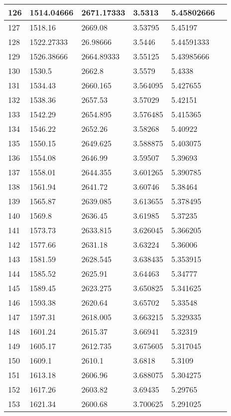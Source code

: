 \documentclass[twocolumn]{article}
\begin{document}
\begin{tabular}{l|l|l|l|l|l}
126	&	1514.04666	&	2671.17333	&	3.5313	&	5.45802666 \\ \hline
127	&	1518.16	&	2669.08	&	3.53795	&	5.45197 \\ \hline
128	&	1522.27333	&	26.98666	&	3.5446	&	5.44591333 \\ \hline
129	&	1526.38666	&	2664.89333	&	3.55125	&	5.43985666 \\ \hline
130	&	1530.5	&	2662.8	&	3.5579	&	5.4338 \\ \hline
131	&	1534.43	&	2660.165	&	3.564095	&	5.427655 \\ \hline
132	&	1538.36	&	2657.53	&	3.57029	&	5.42151 \\ \hline
133	&	1542.29	&	2654.895	&	3.576485	&	5.415365 \\ \hline
134	&	1546.22	&	2652.26	&	3.58268	&	5.40922 \\ \hline
135	&	1550.15	&	2649.625	&	3.588875	&	5.403075 \\ \hline
136	&	1554.08	&	2646.99	&	3.59507	&	5.39693 \\ \hline
137	&	1558.01	&	2644.355	&	3.601265	&	5.390785 \\ \hline
138	&	1561.94	&	2641.72	&	3.60746	&	5.38464 \\ \hline
139	&	1565.87	&	2639.085	&	3.613655	&	5.378495 \\ \hline
140	&	1569.8	&	2636.45	&	3.61985	&	5.37235 \\ \hline
141	&	1573.73	&	2633.815	&	3.626045	&	5.366205 \\ \hline
142	&	1577.66	&	2631.18	&	3.63224	&	5.36006 \\ \hline
143	&	1581.59	&	2628.545	&	3.638435	&	5.353915 \\ \hline
144	&	1585.52	&	2625.91	&	3.64463	&	5.34777 \\ \hline
145	&	1589.45	&	2623.275	&	3.650825	&	5.341625 \\ \hline
146	&	1593.38	&	2620.64	&	3.65702	&	5.33548 \\ \hline
147	&	1597.31	&	2618.005	&	3.663215	&	5.329335 \\ \hline
148	&	1601.24	&	2615.37	&	3.66941	&	5.32319 \\ \hline
149	&	1605.17	&	2612.735	&	3.675605	&	5.317045 \\ \hline
150	&	1609.1	&	2610.1	&	3.6818	&	5.3109 \\ \hline
151	&	1613.18	&	2606.96	&	3.688075	&	5.304275 \\ \hline
152	&	1617.26	&	2603.82	&	3.69435	&	5.29765 \\ \hline
153	&	1621.34	&	2600.68	&	3.700625	&	5.291025 \\ \hline

\end{tabular}
\end{document}
